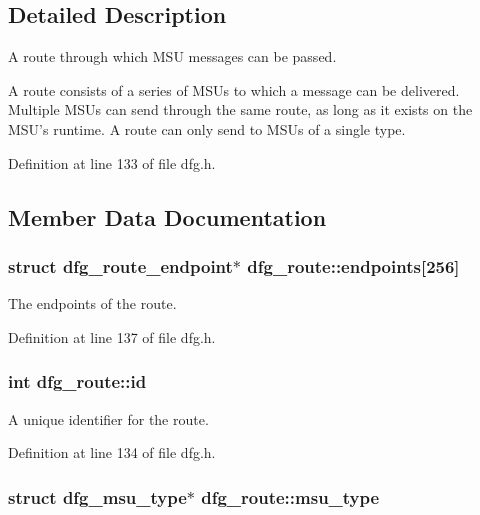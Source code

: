 \subsection{Detailed Description}
A route through which M\-S\-U messages can be passed. 

A route consists of a series of M\-S\-Us to which a message can be delivered. Multiple M\-S\-Us can send through the same route, as long as it exists on the M\-S\-U's runtime. A route can only send to M\-S\-Us of a single type. 

Definition at line 133 of file dfg.\-h.



\subsection{Member Data Documentation}
\hypertarget{structdfg__route_a6e4febfc25853befadf7dc64de1b7cff}{
\subsubsection[{endpoints}]{\setlength{\rightskip}{0pt plus 5cm}struct {\bf dfg\-\_\-route\-\_\-endpoint}$\ast$ dfg\-\_\-route\-::endpoints\mbox{[}256\mbox{]}}}\label{structdfg__route_a6e4febfc25853befadf7dc64de1b7cff}


The endpoints of the route. 



Definition at line 137 of file dfg.\-h.

\hypertarget{structdfg__route_aade838574772b19aa4c562f818a04c4a}{
\subsubsection[{id}]{\setlength{\rightskip}{0pt plus 5cm}int dfg\-\_\-route\-::id}}\label{structdfg__route_aade838574772b19aa4c562f818a04c4a}


A unique identifier for the route. 



Definition at line 134 of file dfg.\-h.

\hypertarget{structdfg__route_abfa4b2c8836a5db1b78c1f64c84f7221}{
\subsubsection[{msu\-\_\-type}]{\setlength{\rightskip}{0pt plus 5cm}struct {\bf dfg\-\_\-msu\-\_\-type}$\ast$ dfg\-\_\-route\-::msu\-\_\-type}}\label{structdfg__route_abfa4b2c8836a5db1b78c1f64c84f7221}


